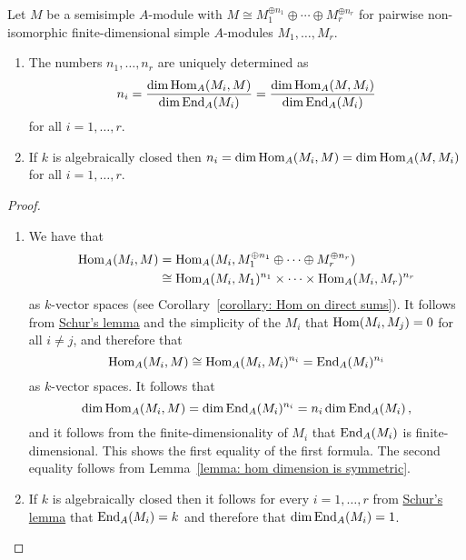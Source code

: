 \begin{lemma}
  \label{lemma: multiplicities via dimension of hom}
  Let $M$ be a semisimple $A$-module with $M \cong M_1^{\oplus n_1} \oplus \dotsb \oplus M_r^{\oplus n_r}$ for pairwise non-isomorphic finite-dimensional simple $A$-modules $M_1, \dotsc, M_r$.
  \begin{enumerate}
    \item
      The numbers $n_1, \dotsc, n_r$ are uniquely determined as
      \[
          n_i
        = \frac{\dim \operatorname{Hom}_A(M_i, M)}{\dim \operatorname{End}_A(M_i)}
        = \frac{\dim \operatorname{Hom}_A(M, M_i)}{\dim \operatorname{End}_A(M_i)}
      \]
      for all $i = 1, \dotsc, r$.
    \item
      If $k$ is algebraically closed then $n_i = \dim \operatorname{Hom}_A(M_i, M) = \dim \operatorname{Hom}_A(M, M_i)$ for all $i = 1, \dotsc, r$.
  \end{enumerate}
\end{lemma}


\begin{proof}
  \leavevmode
  \begin{enumerate}
    \item
      We have that
      \begin{align*}
                \operatorname{Hom}_A(M_i, M)
        &=      \operatorname{Hom}_A(M_i, M_1^{\oplus n_1} \oplus \dotsb \oplus M_r^{\oplus n_r}) \\
        &\cong  \operatorname{Hom}_A(M_i, M_1)^{n_1} \times \dotsb \times \operatorname{Hom}_A(M_i, M_r)^{n_r}
      \end{align*}
      as $k$-vector spaces (see Corollary~\ref{corollary: Hom on direct sums}).
      It follows from \hyperref[proposition: schurs lemma for modules]{Schur’s lemma} and the simplicity of the $M_i$ that $\operatorname{Hom}(M_i, M_j) = 0$ for all $i \neq j$, and therefore that
      \[
              \operatorname{Hom}_A(M_i, M)
        \cong \operatorname{Hom}_A(M_i, M_i)^{n_i}
        =     \operatorname{End}_A(M_i)^{n_i}
      \]
      as $k$-vector spaces.
      It follows that
      \[
          \dim \operatorname{Hom}_A(M_i, M)
        = \dim \operatorname{End}_A(M_i)^{n_i}
        = n_i \dim \operatorname{End}_A(M_i) \,,
      \]
      and it follows from the finite-dimensionality of $M_i$ that $\operatorname{End}_A(M_i)$ is finite-di\-men\-sion\-al.
      This shows the first equality of the first formula.
      The second equality follows from Lemma~\ref{lemma: hom dimension is symmetric}.
    \item
      If $k$ is algebraically closed then it follows for every $i = 1, \dotsc, r$ from \hyperref[proposition: schurs lemma for modules]{Schur’s lemma} that $\operatorname{End}_A(M_i) = k$ and therefore that $\dim \operatorname{End}_A(M_i) = 1$.
    \qedhere
  \end{enumerate}
\end{proof}


